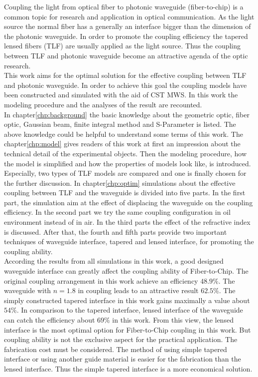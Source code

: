 
Coupling the light from optical fiber to photonic waveguide (fiber-to-chip) is a common topic for research and application in optical communication. As the light source the normal fiber has a generally an interface bigger than the dimension of the photonic waveguide. In order to promote the coupling efficiency the tapered lensed fibers (TLF) are usually applied as the light source. Thus the coupling between TLF and photonic waveguide become an attractive agenda of the optic research. \\ 
This work aims for the optimal solution for the effective coupling between TLF and photonic waveguide. In order to achieve this goal the coupling models have been constructed and simulated with the aid of CST MWS. In this work the modeling procedure and the analyses of the result are recounted.\\
In chapter\ref{chp:background} the basic knowledge about the geometric optic, fiber optic, Gaussian beam, finite integral method and S-Parameter is listed. The above knowledge could be helpful to understand some terms of this work. The chapter\ref{chp:model} gives readers of this work at first an impression about the technical detail of the experimental objects. Then the modeling procedure, how the model is simplified and how the properties of models look like, is introduced. Especially, two types of TLF models are compared and one is finally chosen for the further discussion. In chapter\ref{chp:optim} simulations about the effective coupling between TLF and the waveguide is divided into five parts. In the first part, the simulation aim at the effect of displacing the waveguide on the coupling efficiency. In the second part we try the same coupling configuration in oil environment instead of in air. In the third parts the effect of the refractive index is discussed. After that, the fourth and fifth parts provide two important techniques of waveguide interface, tapered and lensed interface, for promoting the coupling ability.\\         
According the results from all simulations in this work, a good designed waveguide interface can greatly affect the coupling ability of Fiber-to-Chip. The original coupling arrangement in this work achieve an efficiency $48.9\%$. The waveguide with $n=1.8$ in coupling leads to an attractive result $62.5\%$. The simply constructed tapered interface in this work gains maximally a value about $54\%$. In comparison to the tapered interface, lensed interface of the waveguide can catch the efficiency about $69\%$ in this work. From this view, the lensed interface is the most optimal option for Fiber-to-Chip coupling in this work. But coupling ability is not the exclusive aspect for the practical application. The fabrication cost must be considered. The method of using simple tapered interface or using another guide material is easier for the fabrication than the lensed interface. Thus the simple tapered interface is a more economical solution. \\       
